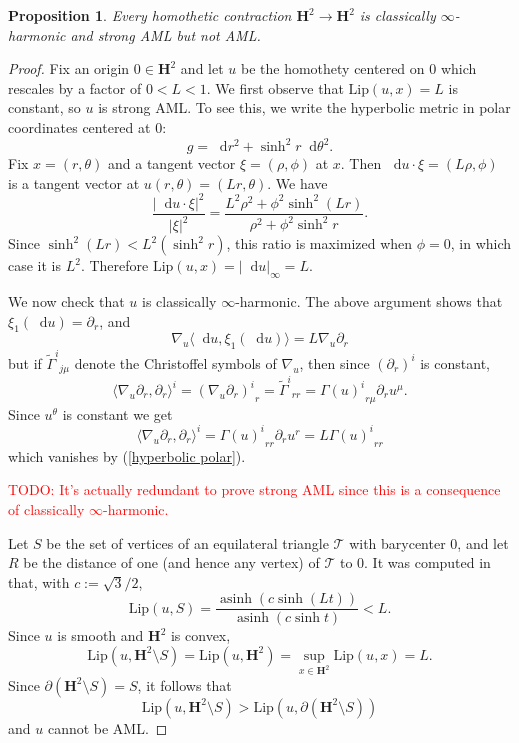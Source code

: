 \documentclass[reqno,11pt]{amsart}
\newcommand{\Hyp}{\mathbf H}
\newcommand*\dif{\mathop{}\!\mathrm{d}}
\DeclareMathOperator{\asinh}{asinh}
\newcommand{\Lip}{\mathrm{Lip}}
\newtheorem{proposition}[theorem]{Proposition}
\theoremstyle{definition}
\numberwithin{equation}{section}
\newcommand\todo[1]{\textcolor{red}{TODO: #1}}
\begin{document}
\begin{proposition}\label{strong AML does not imply AML}
Every homothetic contraction $\Hyp^2 \to \Hyp^2$ is classically $\infty$-harmonic and strong AML but not AML.
\end{proposition}
\begin{proof}
Fix an origin $0 \in \Hyp^2$ and let $u$ be the homothety centered on $0$ which rescales by a factor of $0 < L < 1$.
We first observe that $\Lip(u, x) = L$ is constant, so $u$ is strong AML.
To see this, we write the hyperbolic metric in polar coordinates centered at $0$:
$$g = \dif r^2 + \sinh^2 r \dif \theta^2.$$
Fix $x = (r, \theta)$ and a tangent vector $\xi = (\rho, \phi)$ at $x$.
Then $\dif u \cdot \xi = (L\rho, \phi)$ is a tangent vector at $u(r, \theta) = (Lr, \theta)$.
We have 
$$\frac{|\dif u \cdot \xi|^2}{|\xi|^2} = \frac{L^2 \rho^2 + \phi^2 \sinh^2(Lr)}{\rho^2 + \phi^2 \sinh^2 r}.$$
Since $\sinh^2 (Lr) < L^2 (\sinh^2 r)$, this ratio is maximized when $\phi = 0$, in which case it is $L^2$.
Therefore $\Lip(u, x) = |\dif u|_\infty = L$.

We now check that $u$ is classically $\infty$-harmonic.
The above argument shows that $\xi_1(\dif u) = \partial_r$, and
$$\nabla_u \langle \dif u, \xi_1(\dif u)\rangle = L \nabla_u \partial_r$$
but if ${\tilde \Gamma^i}_{j\mu}$ denote the Christoffel symbols of $\nabla_u$, then since $(\partial_r)^i$ is constant,
$$\langle \nabla_u \partial_r, \partial_r\rangle^i = {(\nabla_u \partial_r)^i}_r = {\tilde \Gamma^i}_{rr} = {\Gamma(u)^i}_{r\mu} \partial_r u^\mu.$$
Since $u^\theta$ is constant we get 
$$\langle \nabla_u \partial_r, \partial_r\rangle^i = {\Gamma(u)^i}_{rr} \partial_r u^r = L{\Gamma(u)^i}_{rr}$$
which vanishes by (\ref{hyperbolic polar}).

\todo{It's actually redundant to prove strong AML since this is a consequence of classically $\infty$-harmonic.}

Let $S$ be the set of vertices of an equilateral triangle $\mathcal T$ with barycenter $0$, and let $R$ be the distance of one (and hence any vertex) of $\mathcal T$ to $0$.
It was computed in \cite[Example 9.6]{Gueritaud17} that, with $c := \sqrt 3/2$,
$$\Lip(u, S) = \frac{\asinh(c \sinh (Lt))}{\asinh(c \sinh t)} < L.$$
Since $u$ is smooth and $\Hyp^2$ is convex,
$$\Lip(u, \Hyp^2 \setminus S) = \Lip(u, \Hyp^2) = \sup_{x \in \Hyp^2} \Lip(u, x) = L.$$
Since $\partial(\Hyp^2 \setminus S) = S$, it follows that
$$\Lip(u, \Hyp^2 \setminus S) > \Lip(u, \partial(\Hyp^2 \setminus S))$$
and $u$ cannot be AML.
\end{proof}
\end{document}
